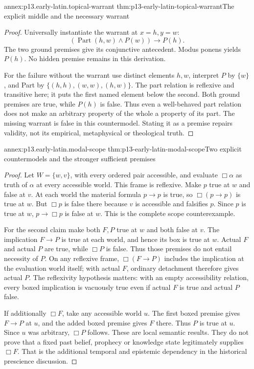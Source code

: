 \begin{annexitem}{annex:p13.early-latin.topical-warrant}
 {thm:p13-early-latin-topical-warrant}{The explicit middle and the necessary warrant}
\begin{proof}
Universally instantiate the warrant at \(x=h,y=w\):
\[
 (\operatorname{Part}(h,w)\land P(w))\to P(h).
\]
The two ground premises give its conjunctive antecedent.
Modus ponens yields \(P(h)\).
No hidden premise remains in this derivation.

For the failure without the warrant use distinct elements \(h,w\),
interpret \(P\) by \(\{w\}\), and Part by
\(\{(h,h),(w,w),(h,w)\}\).
The part relation is reflexive and transitive here; it puts the
first named element below the second. Both ground premises are true,
while \(P(h)\) is false.
Thus even a well-behaved part relation does not make an arbitrary
property of the whole a property of its part.
The missing warrant is false in this countermodel.
Stating it as a premise repairs validity, not its empirical,
metaphysical or theological truth.
\end{proof}
\end{annexitem}

\begin{annexitem}{annex:p13.early-latin.modal-scope}
 {thm:p13-early-latin-modal-scope}{Two explicit countermodels and the stronger sufficient premises}
\begin{proof}
Let \(W=\{w,v\}\), with every ordered pair accessible, and evaluate
\(\Box\alpha\) as truth of \(\alpha\) at every accessible world.
This frame is reflexive.
Make \(p\) true at \(w\) and false at \(v\).
At each world the material formula \(p\to p\) is true,
so \(\Box(p\to p)\) is true at \(w\).
But \(\Box p\) is false there because \(v\) is accessible and falsifies \(p\).
Since \(p\) is true at \(w\), \(p\to\Box p\) is false at \(w\).
This is the complete scope counterexample.

For the second claim make both \(F,P\) true at \(w\) and both
false at \(v\). The implication \(F\to P\) is true at each world,
and hence its box is true at \(w\). Actual \(F\) and actual \(P\)
are true, while \(\Box P\) is false.
Thus those premises do not entail necessity of \(P\).
On any reflexive frame, \(\Box(F\to P)\) includes the implication
at the evaluation world itself; with actual \(F\), ordinary
detachment therefore gives actual \(P\).
The reflexivity hypothesis matters: with an empty accessibility
relation, every boxed implication is vacuously true even if actual
\(F\) is true and actual \(P\) false.

If additionally \(\Box F\), take any accessible world \(u\).
The first boxed premise gives \(F\to P\) at \(u\), and
the added boxed premise gives \(F\) there. Thus \(P\) is true at \(u\).
Since \(u\) was arbitrary, \(\Box P\) follows.
These are local semantic results. They do not prove that a fixed past
belief, prophecy or knowledge state legitimately supplies \(\Box F\).
That is the additional temporal and epistemic dependency in the
historical prescience discussion.
\end{proof}
\end{annexitem}

